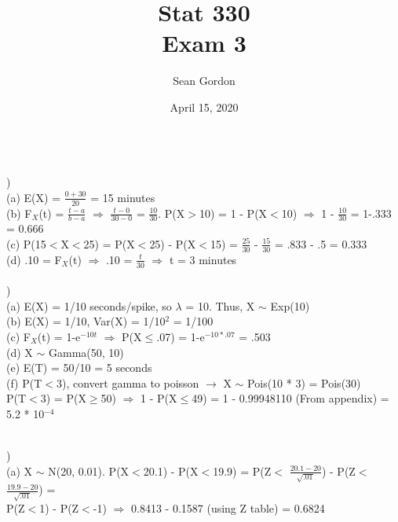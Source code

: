 \documentclass[12pt]{article}
\title{Stat 330\\Exam 3}
\author{Sean Gordon}
\date{April 15, 2020}
\begin{document}
\maketitle


\noindent\hrulefill \\[-.8em]


) \\
\indent(a) E(X) = {\Large $\frac{0+30}{20}$} = 15 minutes\\

\indent (b) F$_X$(t) = {\Large $\frac{t - a}{b - a}$} $\Rightarrow$ {\Large $\frac{t - 0}{30 - 0}$} = {\Large $\frac{10}{30}$}. P(X$>$10) = 1 - P(X$<$10) $\Rightarrow$ 1 - {\Large $\frac{10}{30}$} = 1-.333 = 0.666\\

\indent (c) P(15$<$X$<$25) = P(X$<$25) - P(X$<$15) = {\Large $\frac{25}{30}$} - {\Large $\frac{15}{30}$} = .833 - .5 = 0.333\\

\indent (d) .10 = F$_X$(t) $\Rightarrow$ .10 = {\Large $\frac{t}{30}$} $\Rightarrow$ t = 3 minutes\\


\noindent \hrulefill \\


)\\
\indent(a) E(X) = 1/10 seconds/spike, so $\lambda$ = 10. Thus, X $\sim$ Exp(10)\\

\indent (b) E(X) = 1/10, Var(X) = 1/10$^2$ = 1/100\\

\indent (c) F$_X$(t) = 1-e$^{-10t}$ $\Rightarrow$ P(X$\le$.07) = 1-e$^{-10*.07}$ = .503\\

\indent (d) X $\sim$ Gamma(50, 10)\\

\indent (e) E(T) = 50/10 = 5 seconds\\

\indent (f) P(T$<$3), convert gamma to poisson $\rightarrow$ X $\sim$ Pois(10 * 3) = Pois(30)\\
\indent \indent P(T$<$3) = P(X$\ge$50) $\Rightarrow$ 1 - P(X$\le$49) = 1 - 0.99948110 (From appendix) = 5.2 * 10$^{-4}$\\


\noindent \hrulefill \\
\pagebreak


) \\
\indent (a) X $\sim$ N(20, 0.01). P(X$<$20.1) - P(X$<$19.9) = P(Z$<$ {\Large $\frac{20.1 - 20}{\sqrt{.01}}$}) - P(Z$<$ {\Large $\frac{19.9 - 20}{\sqrt{.01}}$}) = \\
\indent \indent P(Z$<$1) - P(Z$<$-1) $\Rightarrow$ 0.8413 - 0.1587 (using Z table) = 0.6824\\
\end{document}
